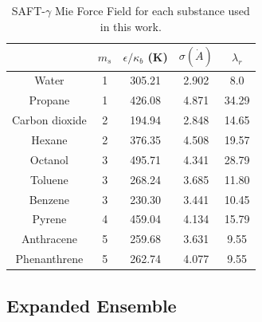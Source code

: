 \documentclass[final,12p,times,twocolumn]{elsarticle}
\begin{document}
	
	\begin{table}[h]
		\centering
		\caption{SAFT-$\gamma$ Mie Force Field for each substance used in this work.}
		\label{tbl:parameters}
		\begin{tabular}{ccccc}
			\hline\hline
			& $m_s$ & $\epsilon/\kappa_{b}$ (K) & $\sigma (\dot{A})$ & $\lambda_r$ \\ \hline
			Water \cite{lobanova2016}        & 1     & 305.21               & 2.902              & 8.0         \\
			Propane \cite{herdes2015}        & 1     & 426.08               & 4.871              & 34.29       \\
			Carbon dioxide \cite{herdes2015} & 2     & 194.94               & 2.848              & 14.65       \\
			Hexane \cite{herdes2015}         & 2     & 376.35               & 4.508              & 19.57       \\
			Octanol \cite{ervik2016}         & 3     & 495.71               & 4.341              & 28.79       \\
			Toluene \cite{muller2017}        & 3     & 268.24               & 3.685              & 11.80       \\
			Benzene \cite{muller2017}        & 3     & 230.30               & 3.441              & 10.45       \\
			Pyrene \cite{muller2017}         & 4     & 459.04               & 4.134              & 15.79       \\
			Anthracene \cite{muller2017}     & 5     & 259.68               & 3.631              & 9.55        \\
			Phenanthrene                     & 5     & 262.74               & 4.077              & 9.55        \\ \hline\hline
		\end{tabular}
		
	\end{table}
	
	\subsection{Expanded Ensemble}
	
\end{document}
